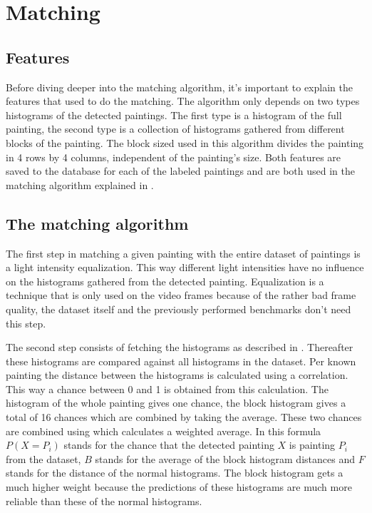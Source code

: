 \section{Matching}
\label{sec:matching}

\subsection{Features}
\label{subsec:the-features}

Before diving deeper into the matching algorithm, it's important to explain the features that used to do the matching. The algorithm only depends on two types histograms of the detected paintings. The first type is a histogram of the full painting, the second type is a collection of histograms gathered from different blocks of the painting. The block sized used in this algorithm divides the painting in 4 rows by 4 columns, independent of the painting's size. Both features are saved to the database for each of the labeled paintings and are both used in the matching algorithm explained in .

\subsection{The matching algorithm}
\label{subsec:matching-algo}

The first step in matching a given painting with the entire dataset of paintings is a light intensity equalization. This way different light intensities have no influence on the histograms gathered from the detected painting. Equalization is a technique that is only used on the video frames because of the rather bad frame quality, the dataset itself and the previously performed benchmarks don't need this step.

The second step consists of fetching the histograms as described in . Thereafter these histograms are compared against all histograms in the dataset. Per known painting the distance between the histograms is calculated using a correlation. This way a chance between 0 and 1 is obtained from this calculation. The histogram of the whole painting gives one chance, the block histogram gives a total of 16 chances which are combined by taking the average. These two chances are combined using  which calculates a weighted average. In this formula $P(X = P_{i})$ stands for the chance that the detected painting $X$ is painting $P_{i}$ from the dataset, $B$ stands for the average of the block histogram distances and $F$ stands for the distance of the normal histograms. The block histogram gets a much higher weight because the predictions of these histograms are much more reliable than these of the normal histograms.

